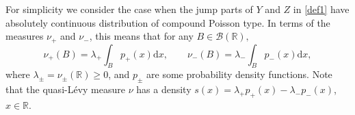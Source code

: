 \documentclass[a4paper,11pt]{article}
\theoremstyle{definition}
\newcommand{\R}{{\mathbb{R}}}
\newcommand{\1}{\mathbb{I}}
\def\R{\mathbb{R}}
\newcommand{\B}{\mathcal{B}}%
\theoremstyle{remark}
\begin{document}
For simplicity we consider  the case when the jump parts of  \(Y\) and \(Z\) in \eqref{def1} have absolutely continuous distribution of compound Poisson type. In terms of the  measures $\nu_{+}$ and $\nu_{-}$, this means that for any \(B \in \B(\mathbb{R}),\)
\begin{equation*}
    \nu_{+}(B) = \lambda_{+}\int_{B}p_{+}(x)\mathrm{d}x, \qquad \nu_{-}(B) = \lambda_{-}\int_{B}p_{-}(x)\mathrm{d}x,
\end{equation*}
where \(\lambda_{\pm} = \nu_{\pm}(\R) \geq 0\), and 
$p_{\pm}$  are some probability  density functions.  Note that the quasi-L{\'e}vy measure \(\nu\) has a density \(s(x) = \lambda_+ p_+(x) - \lambda_- p_-(x)\), \(x\in \R.\)

\end{document}
